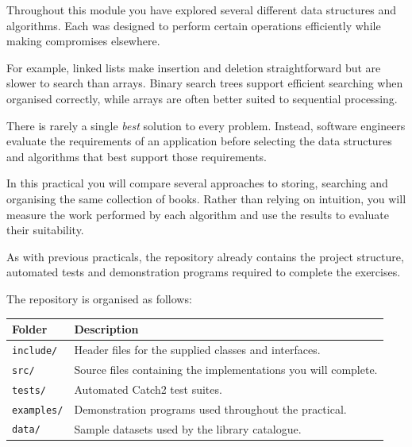 \documentclass{csc2059practical}
\begin{document}

Throughout this module you have explored several different data structures and algorithms. Each was designed to perform certain operations efficiently while making compromises elsewhere.

For example, linked lists make insertion and deletion straightforward but are slower to search than arrays. Binary search trees support efficient searching when organised correctly, while arrays are often better suited to sequential processing.

There is rarely a single \emph{best} solution to every problem. Instead, software engineers evaluate the requirements of an application before selecting the data structures and algorithms that best support those requirements.

In this practical you will compare several approaches to storing, searching and organising the same collection of books. Rather than relying on intuition, you will measure the work performed by each algorithm and use the results to evaluate their suitability.


As with previous practicals, the repository already contains the project structure, automated tests and demonstration programs required to complete the exercises.

The repository is organised as follows:

\begin{center}
\begin{tabular}{ll}
\toprule
Folder & Description \\
\midrule
\texttt{include/} & Header files for the supplied classes and interfaces. \\
\texttt{src/} & Source files containing the implementations you will complete. \\
\texttt{tests/} & Automated Catch2 test suites. \\
\texttt{examples/} & Demonstration programs used throughout the practical. \\
\texttt{data/} & Sample datasets used by the library catalogue. \\
\bottomrule
\end{tabular}
\end{center}
\end{document}
